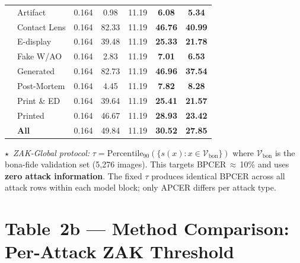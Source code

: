 \documentclass{article}
\newcommand{\B}[1]{\textbf{#1}}
\begin{document}
\begin{table}[!htbp]
\begin{tabular}{l l c c c c c}
& Artifact          & 0.164 &   0.98 & 11.19 &  \B{6.08} &  \B{5.34} \\
& Contact Lens      & 0.164 &  82.33 & 11.19 & \B{46.76} & \B{40.99} \\
& E-display         & 0.164 &  39.48 & 11.19 & \B{25.33} & \B{21.78} \\
& Fake W/AO         & 0.164 &   2.83 & 11.19 &  \B{7.01} &  \B{6.53} \\
& Generated         & 0.164 &  82.73 & 11.19 & \B{46.96} & \B{37.54} \\
& Post-Mortem       & 0.164 &   4.45 & 11.19 &  \B{7.82} &  \B{8.28} \\
& Print \& ED       & 0.164 &  39.64 & 11.19 & \B{25.41} & \B{21.57} \\
& Printed           & 0.164 &  46.67 & 11.19 & \B{28.93} & \B{23.42} \\
\cmidrule(lr){2-7}
& \textbf{All}      & 0.164 &  49.84 & 11.19 & \B{30.52} & \B{27.85} \\

\bottomrule
\end{tabular}

\vspace{4pt}
\noindent\footnotesize
$\star$~\textit{ZAK-Global protocol:}
$\tau = \mathrm{Percentile}_{90}(\{s(x): x \in \mathcal{V}_{\mathrm{bon}}\})$
where $\mathcal{V}_{\mathrm{bon}}$ is the bona-fide validation set (5{,}276 images).
This targets BPCER\,$\approx$\,10\% and uses \textbf{zero attack information}.
The fixed $\tau$ produces identical BPCER across all attack rows within each
model block; only APCER differs per attack type.
\end{table}


\section*{Table~2b — Method Comparison: Per-Attack ZAK Threshold}
\end{document}
